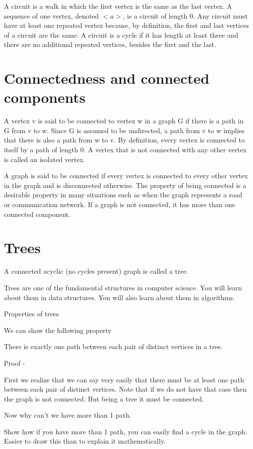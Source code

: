 \documentclass[12pt]{article}
\begin{document}
A circuit is a walk in which the first vertex is the same as the last vertex. A sequence of one vertex, denoted $<a>$, is a circuit of length 0. Any circuit must have at least one repeated vertex because, by definition, the first and last vertices of a circuit are the same. A circuit is a cycle if it has length at least three and there are no additional repeated vertices, besides the first and the last. 

\section*{Connectedness and connected components}

A vertex v is said to be connected to vertex w in a graph G if there is a path in G from v to w. Since G is assumed to be undirected, a path from v to w implies that there is also a path from w to v. By definition, every vertex is connected to itself by a path of length 0. A vertex that is not connected with any other vertex is called an isolated vertex.

A graph is said to be connected if every vertex is connected to every other vertex in the graph and is disconnected otherwise. The property of being connected is a desirable property in many situations such as when the graph represents a road or communication network. If a graph is not connected, it has more than one connected component. 

\section*{Trees}

A connected acyclic (no cycles present) graph is called a tree. 

Trees are one of the fundamental structures in computer science. You will learn about them in data structures. You will also learn about them in algorithms.

Properties of trees

We can show the following property

There is exactly one path between each pair of distinct vertices in a tree.

Proof - 

First we realize that we can say very easily that there must be at least one path between each pair of distinct vertices. Note that if we do not have that case then the graph is not connected. But being a tree it must be connected.

Now why can't we have more than 1 path. 

Show how if you have more than 1 path, you can easily find a cycle in the graph. Easier to draw this than to explain it mathematically.
 
\end{document}
